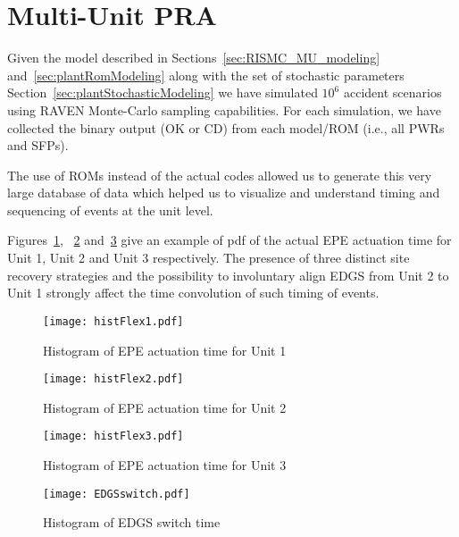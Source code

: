 \section{Multi-Unit PRA}
\label{sec:multiUnitPRA}

Given the model described in Sections~\ref{sec:RISMC_MU_modeling} and~\ref{sec:plantRomModeling} 
along with the set of stochastic parameters Section~\ref{sec:plantStochasticModeling} we have 
simulated $10^6$ accident scenarios using RAVEN Monte-Carlo sampling
capabilities. For each simulation, we have collected the binary output (OK or CD) from 
each model/ROM (i.e., all PWRs and SFPs).

The use of ROMs instead of the actual codes allowed us to generate this very large 
database of data which helped us to visualize and understand timing and sequencing of events at 
the unit level.

Figures~\ref{fig:histFlex1}, ~\ref{fig:histFlex2} and~\ref{fig:histFlex3} give an example of pdf
of the actual EPE actuation time for Unit 1, Unit 2 and Unit 3 respectively. 
The presence of three distinct site recovery strategies and the possibility to involuntary align
EDGS from Unit 2 to Unit 1 strongly affect the time convolution of such timing of events. 

\begin{figure}
    \centering
    \texttt{[image: histFlex1.pdf]}
    \caption{Histogram of EPE actuation time for Unit 1}
    \label{fig:histFlex1}
\end{figure}

\begin{figure}
    \centering
    \texttt{[image: histFlex2.pdf]}
    \caption{Histogram of EPE actuation time for Unit 2}
    \label{fig:histFlex2}
\end{figure}

\begin{figure}
    \centering
    \texttt{[image: histFlex3.pdf]}
    \caption{Histogram of EPE actuation time for Unit 3}
    \label{fig:histFlex3}
\end{figure}

\begin{figure}
    \centering
    \texttt{[image: EDGSswitch.pdf]}
    \caption{Histogram of EDGS switch time}
    \label{fig:EDGSswitch}
\end{figure}